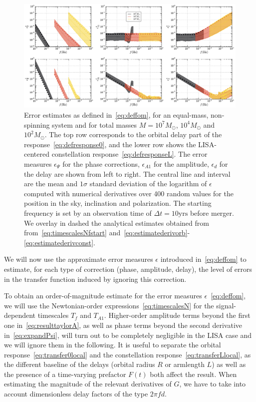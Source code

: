 \documentclass[aps,showpacs,twocolumn,
prd,superscriptaddress,nofootinbib]{revtex4-1}
\newcommand{\Msol}{M_{\odot}}
\newcommand{\Tf}{T_{f}}
\begin{document}
\begin{figure}
  \centering
  \includegraphics[width=.98\linewidth]{plots/lisafom_py.pdf}
  \caption{Error estimates as defined in~\eqref{eq:deffom}, for an equal-mass, non-spinning system and for total masses $M=10^{7} \Msol$, $10^{4} \Msol$ and $10^{2} \Msol$. The top row corresponds to the orbital delay part of the response~\eqref{eq:defresponse0}, and the lower row shows the LISA-centered constellation response~\eqref{eq:defresponseL}. The error measures $\epsilon_{\Psi}$ for the phase corrections, $\epsilon_{A1}$ for the amplitude, $\epsilon_{d}$ for the delay are shown from left to right. The central line and interval are the mean and $1\sigma$ standard deviation of the logarithm of $\epsilon$ computed with numerical derivatives over 400 random values for the position in the sky, inclination and polarization. The starting frequency is set by an observation time of $\Delta t = 10 \text{yrs}$ before merger. We overlay in dashed the analytical estimates obtained from from~\eqref{eq:timescalesNfstart} and~\eqref{eq:estimatederivorb}-\eqref{eq:estimatederivconst}.}
  \label{fig:fomLISA}
\end{figure}

We will now use the approximate error measures $\epsilon$ introduced in~\eqref{eq:deffom} to estimate, for each type of correction (phase, amplitude, delay), the level of errors in the transfer function induced by ignoring this correction.

To obtain an order-of-magnitude estimate for the error measures $\epsilon$~\eqref{eq:deffom}, we will use the Newtonian-order expressions~\eqref{eq:timescalesN} for the signal-dependent timescales $\Tf$ and $T_{A1}$. Higher-order amplitude terms beyond the first one in~\eqref{eq:resulttaylorA}, as well as phase terms beyond the second derivative in~\eqref{eq:expandPsi}, will turn out to be completely negligible in the LISA case and we will ignore them in the following. It is useful to separate the orbital response~\eqref{eq:transfer0local} and the constellation response~\eqref{eq:transferLlocal}, as the different baseline of the delays (orbital radius $R$ or armlength $L$) as well as the presence of a time-varying prefactor $F(t)$ both affect the result. When estimating the magnitude of the relevant derivatives of $G$, we have to take into account dimensionless delay factors of the type $2\pi f d$.
\end{document}
